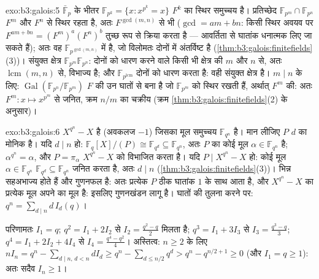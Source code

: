 \begin{solution}{exo:b3:galois:5}
$\bar{\mathbb F}_p$ के भीतर $\mathbb F_{p^k} = \{x : x^{p^k} =
x\}$ $F^k$ का स्थिर समुच्चय है। प्रतिच्छेद $\mathbb F_{p^m}
\cap \mathbb F_{p^n}$
$F^m$ और $F^n$ से स्थिर रहता है, अतः $F^{\gcd(m,n)}$ से भी ($\gcd = am + bn$: किसी स्थिर
अवयव पर $F^{am +
bn} = (F^m)^a(F^n)^b$ तुच्छ रूप से क्रिया करता है --- आवर्तिता से घातांक
धनात्मक लिए जा सकते हैं); अतः वह $\mathbb
F_{p^{\gcd(m,n)}}$ में है, जो विलोमतः दोनों में
अंतर्विष्ट है (\cref{thm:b3:galois:finitefields}(3))। संयुक्त क्षेत्र $\mathbb
F_{p^m}\mathbb F_{p^n}$: दोनों को धारण करने
वाले किसी भी क्षेत्र की  $m$ और $n$ से, अतः $\operatorname{lcm}(m,n)$ से, विभाज्य
है; और $\mathbb F_{p^{\operatorname{lcm}}}$ दोनों को धारण करता है: वही संयुक्त क्षेत्र है। $m \mid n$
के लिए: $\operatorname{Gal}(\mathbb
F_{p^n}/\mathbb F_{p^m})$ $F$ की उन घातों से बना है जो $\mathbb F_{p^m}$ को स्थिर रखती
हैं, अर्थात् $F^m$ की: अतः $F^m \colon x \mapsto x^{p^m}$ से जनित, क्रम $n/m$ का चक्रीय (क्रम
\cref{thm:b3:galois:finitefields}(2) के अनुसार)।
\end{solution}

\begin{solution}{exo:b3:galois:6}
$X^{q^n} - X$  है (अवकलज $-1$) जिसका मूल समुच्चय $\mathbb F_{q^n}$ है। मान लीजिए
$P$  $d$ का मोनिक  है। यदि $d \mid n$ हो: $\mathbb F_q[X]/(P) \cong \mathbb F_{q^d}
\subseteq \mathbb F_{q^n}$, अतः $P$
का कोई मूल $\alpha \in
\mathbb F_{q^n}$ है; $\alpha^{q^n} = \alpha$, और $P =
\pi_\alpha$ $X^{q^n} - X$ को विभाजित करता है। यदि
$P \mid X^{q^n} - X$ हो: कोई मूल $\alpha \in \mathbb F_{q^n}$ $\mathbb F_{q^d}
\subseteq \mathbb F_{q^n}$ जनित करता है, अतः $d \mid n$ (\cref{thm:b3:galois:finitefields}(3))।
भिन्न  सहअभाज्य होते हैं और गुणनफल  है: अतः प्रत्येक
$P$ ठीक घातांक $1$ के साथ आता है, और $X^{q^n}-X$ का प्रत्येक मूल अपने
 का मूल है: इसलिए गुणनखंडन लागू है। घातों की तुलना
करने पर: $q^n = \sum_{d\mid n} d\,I_d(q)$।

परिणामतः $I_1 = q$; $q^2 = I_1 + 2I_2$ से $I_2 =
\frac{q^2 - q}2$ मिलता है; $q^3 = I_1 + 3I_3$ से $I_3 = \frac{q^3 -
q}3$; $q^4 = I_1 + 2I_2 + 4I_4$ से
$I_4 = \frac{q^4 -
q^2}4$। अस्तित्व: $n \geq 2$ के लिए $nI_n = q^n - \sum_{d \mid n,\, d < n}
dI_d \geq q^n - \sum_{d \leq n/2} q^d > q^n - q^{n/2 + 1} \geq
0$ (और $I_1 = q \geq 1$): अतः सदैव $I_n \geq 1$।
\end{solution}

